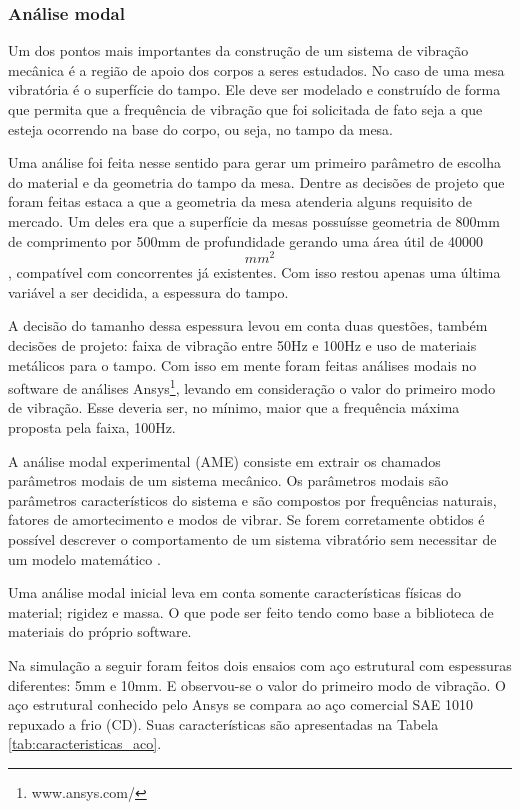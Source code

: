 \subsubsection*{\textbf{Análise modal}}	

Um dos pontos mais importantes da construção de um sistema de vibração mecânica é a região de apoio dos corpos a seres estudados. No caso de uma mesa vibratória é o superfície do tampo. Ele deve ser modelado e construído de forma que permita que a frequência de vibração que foi solicitada de fato seja a que esteja ocorrendo na base do corpo, ou seja, no tampo da mesa.

	Uma análise foi feita nesse sentido para gerar um primeiro parâmetro de escolha do material e da geometria do tampo da mesa. Dentre as decisões de projeto que foram feitas estaca a que a geometria da mesa atenderia alguns requisito de mercado. Um deles era que a superfície da mesas possuísse geometria de 800mm de comprimento por 500mm de profundidade gerando uma área útil de 40000 \[mm^2\], compatível com concorrentes já existentes. Com isso restou apenas uma última variável a ser decidida, a espessura do tampo.
    
	A decisão do tamanho dessa espessura levou em conta duas questões, também decisões de projeto: faixa de vibração entre 50Hz e 100Hz e uso de materiais metálicos para o tampo. Com isso em mente foram feitas análises modais no software de análises Ansys\footnote{www.ansys.com/}, levando em consideração o valor do primeiro modo de vibração. Esse deveria ser, no mínimo, maior que a frequência máxima proposta pela faixa, 100Hz.
    
	A análise modal experimental (AME) consiste em extrair os chamados parâmetros modais de um sistema mecânico. Os parâmetros modais são parâmetros característicos do sistema e são compostos por frequências naturais, fatores de amortecimento e modos de vibrar. Se forem corretamente obtidos é possível descrever o comportamento de um sistema vibratório sem necessitar de um modelo matemático \cite{evandro}.
    
	Uma análise modal inicial leva em conta somente características físicas do material; rigidez e massa. O que pode ser feito tendo como base a biblioteca de materiais do próprio software. 
    
	Na simulação a seguir foram feitos dois ensaios com aço estrutural com espessuras diferentes: 5mm e 10mm. E observou-se o valor do primeiro modo de vibração. O aço estrutural conhecido pelo Ansys se compara ao aço comercial SAE 1010 repuxado a frio (CD). Suas características são apresentadas na Tabela \ref{tab:caracteristicas_aco}.

